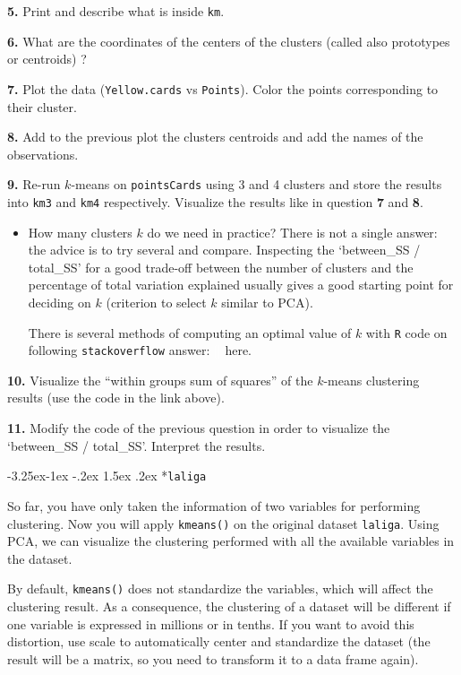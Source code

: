 \documentclass[]{book}
\makeatletter
\newenvironment{rmdblock}[1]
  {\begin{shaded*}
  \begin{itemize}
  \renewcommand{\labelitemi}{
    \raisebox{-.7\height}[0pt][0pt]{
      {\setkeys{Gin}{width=2em,keepaspectratio}\texttt{[image: img/icons/\#1]}}
    }
  }
  \item
  }
  {
  \end{itemize}
  \end{shaded*}
  }
\newenvironment{rmdcaution}
  {\begin{rmdblock}{caution}}
  {\end{rmdblock}}
\renewcommand\subsection{\@startsection{subsection}{2}{\z@}%
                                     {-3.25ex\@plus -1ex \@minus -.2ex}%
                                     {1.5ex \@plus .2ex}%
                                     {\normalfont\large\bfseries\color{Violet}}}
\theoremstyle{definition}
\theoremstyle{definition}
\theoremstyle{definition}
\theoremstyle{remark}
\makeatother
\begin{document}
\textbf{5.} Print and describe what is inside \texttt{km}.

\textbf{6.} What are the coordinates of the centers of the clusters
(called also prototypes or centroids) ?

\textbf{7.} Plot the data (\texttt{Yellow.cards} vs \texttt{Points}).
Color the points corresponding to their cluster.

\textbf{8.} Add to the previous plot the clusters centroids and add the
names of the observations.

\textbf{9.} Re-run \(k\)-means on \texttt{pointsCards} using 3 and 4
clusters and store the results into \texttt{km3} and \texttt{km4}
respectively. Visualize the results like in question \textbf{7} and
\textbf{8}.

\begin{rmdcaution}
How many clusters \(k\) do we need in practice? There is not a single
answer: the advice is to try several and compare. Inspecting the
`between\_SS / total\_SS' for a good trade-off between the number of
clusters and the percentage of total variation explained usually gives a
good starting point for deciding on \(k\) (criterion to select \(k\)
similar to PCA).

There is several methods of computing an optimal value of \(k\) with
\texttt{R} code on following \texttt{stackoverflow} answer:
\textcolor{white}{[}\faStackOverflow\textcolor{white}{]} here.
\end{rmdcaution}

\textbf{10.} Visualize the ``within groups sum of squares'' of the
\(k\)-means clustering results (use the code in the link above).

\textbf{11.} Modify the code of the previous question in order to
visualize the `between\_SS / total\_SS'. Interpret the results.

\subsection*{\texorpdfstring{\texttt{laliga}}{laliga}}\label{laliga}

So far, you have only taken the information of two variables for
performing clustering. Now you will apply \texttt{kmeans()} on the
original dataset \texttt{laliga}. Using PCA, we can visualize the
clustering performed with all the available variables in the dataset.

By default, \texttt{kmeans()} does not standardize the variables, which
will affect the clustering result. As a consequence, the clustering of a
dataset will be different if one variable is expressed in millions or in
tenths. If you want to avoid this distortion, use scale to automatically
center and standardize the dataset (the result will be a matrix, so you
need to transform it to a data frame again).
\end{document}
